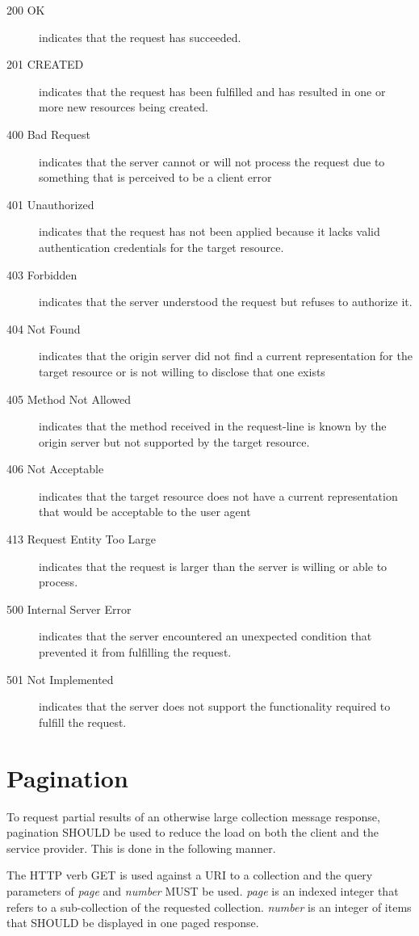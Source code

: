 \documentclass[10pt,a4paper]{article}
\begin{document}
\begin{description}
\item[200 OK] indicates that the request has succeeded.
\item[201 CREATED] indicates that the request has been fulfilled and has resulted in one or more new resources being created.
\item[400 Bad Request] indicates that the server cannot or will not process the request due to something that is perceived to be a client error
\item[401 Unauthorized] indicates that the request has not been applied because it lacks valid authentication credentials for the target resource.
\item[403 Forbidden] indicates that the server understood the request but refuses to authorize it.
\item[404 Not Found] indicates that the origin server did not find a current representation for the target resource or is not willing to disclose that one exists
\item[405 Method Not Allowed] indicates that the method received in the request-line is known by the origin server but not supported by the target resource.
\item[406 Not Acceptable] indicates that the target resource does not have a current representation that would be acceptable to the user agent
\item[413 Request Entity Too Large] indicates that the request is larger than the server is willing or able to process.
\item[500 Internal Server Error] indicates that the server encountered an unexpected condition that prevented it from fulfilling the request.
\item[501 Not Implemented] indicates that the server does not support the functionality required to fulfill the request.
\end{description}

\section{Pagination}

To request partial results of an otherwise large collection message response, pagination SHOULD be used to reduce the load on 
both the client and the service provider. This is done in the following manner.

The HTTP verb GET is used against a URI to a collection and the query parameters of {\em page} and {\em number} MUST be used. {\em page} is an indexed
integer that refers to a sub-collection of the requested collection. {\em number} is an integer of items that SHOULD be displayed in one paged response.
\end{document}
